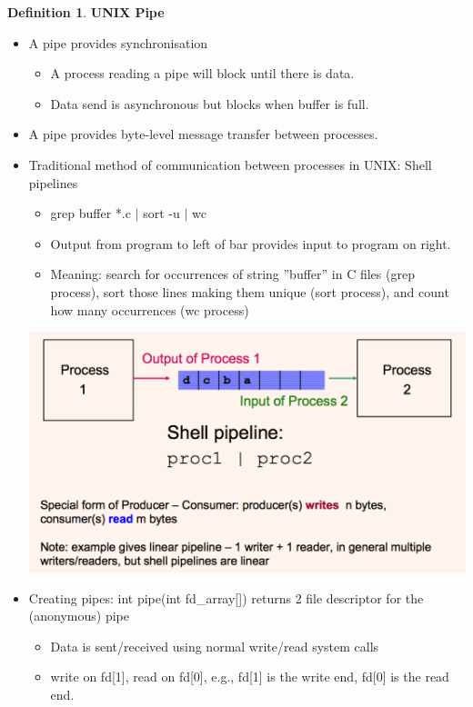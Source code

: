 \documentclass[12pt,a4paper]{article}
\theoremstyle{definition}
\newtheorem{definition}{Definition}[section]
\newenvironment{myitemize}
{ \begin{itemize}
    \setlength{\itemsep}{5pt}
    \setlength{\parskip}{0pt}
    \setlength{\parsep}{0pt}     }
{ \end{itemize}                  }
\begin{document}
\begin{definition}{\textbf{UNIX Pipe}}
	\begin{myitemize}
		\item A pipe provides synchronisation
	\begin{myitemize}
		\item A process reading a pipe will block until there is data.
		\item Data send is asynchronous but blocks when buffer is full.
	\end{myitemize}
	\item A pipe provides byte-level message transfer between processes.
	\item Traditional method of communication between processes in UNIX: \textsf{Shell pipelines}
	\begin{myitemize}
		\item \textsf{grep buffer *.c $|$ sort -u $|$ wc}
		\item Output from program to left of bar provides input to program on right.
		\item Meaning: search for occurrences of string ''buffer'' in C files (grep process), sort those lines making them unique (sort process), and count how many occurrences  (wc process)
	\end{myitemize}
	\begin{center}
		\includegraphics[scale=0.4]{m1/unixPipe}
	\end{center}
	\item Creating pipes: \textsf{int pipe(int fd\_array[])} returns 2 file descriptor for the (anonymous) pipe
	\begin{myitemize}
		\item Data is sent/received using normal write/read system calls
		\item write on \textsf{fd[1]}, read on \textsf{fd[0]}, e.g., \textsf{fd[1]} is the write end, \textsf{fd[0]} is the read end.

\end{myitemize}
\end{myitemize}
\end{definition}
\end{document}
